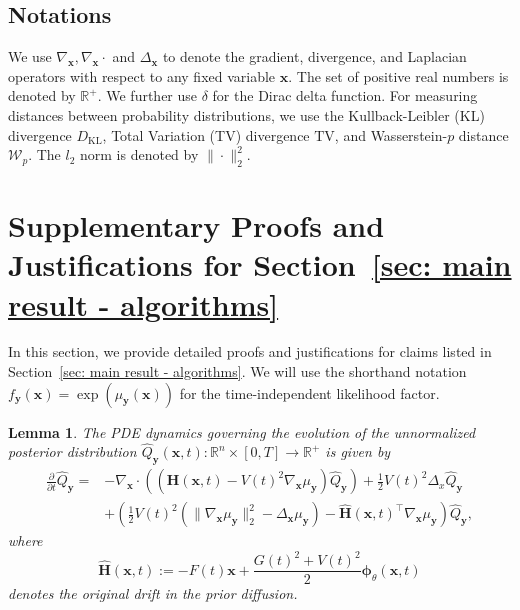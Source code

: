 \documentclass{article}
\numberwithin{equation}{section}
\newtheorem{lemma}[theorem]{Lemma}
\def\vx{{\bm{x}}}
\def\vy{{\bm{y}}}
\def\vphi{{\bm{\phi}}}
\def\mH{{\bm{H}}}
\def\gW{{\mathcal{W}}}
\newcommand{\KL}{D_{\mathrm{KL}}}
\newcommand{\TV}{\mathrm{TV}}
\begin{document}


\subsection{Notations}

We use $\nabla_{\vx}, \nabla_{\vx} \cdot$ and $\Delta_{\vx}$ to denote the gradient, divergence, and Laplacian operators with respect to any fixed variable $\vx$. The set of positive real numbers is denoted by $\mathbb{R}^{+}$. We further use $\delta$ for the Dirac delta function. For measuring distances between probability distributions, we use the Kullback-Leibler (KL) divergence $\KL$, Total Variation (TV) divergence $\TV$, and Wasserstein-$p$ distance $\gW_p$. The $l_2$ norm is denoted by $\|\cdot\|_2^2$.

\section{Supplementary Proofs and Justifications for Section~\ref{sec: main result - algorithms}}
\label{sec: derivations for Sec 3}
In this section, we provide detailed proofs and justifications for claims listed in Section~\ref{sec: main result - algorithms}. We will use the shorthand notation $f_{\vy}(\vx) = \exp(\mu_{\vy}(\vx))$ for the time-independent likelihood factor. 

\begin{lemma}
    \label{lem: simplifying dynamics}    
    The PDE dynamics governing the evolution of the unnormalized posterior distribution $\widehat{Q}_{\vy}(\vx,t):\mathbb{R}^n \times [0, T] \rightarrow \mathbb{R}^{+}$ is given by
    \begin{equation}
    \label{eqn: PDE of unnormalized posterior diffusion app}
        \begin{aligned}
        \frac{\partial}{\partial t}\widehat{Q}_{\vy} = &-\nabla_{\vx} \cdot \left(\left(\widehat{\mH}(\vx,t)-V(t)^2\nabla_{\vx}\mu_{\vy}\right)\widehat{Q}_{\vy}\right)
        +\frac{1}{2}V(t)^2\Delta_{x}\widehat{Q}_{\vy}\\
        &+\left(\frac{1}{2}V(t)^2\left(\|\nabla_{\vx}\mu_{\vy}\|_2^2-\Delta_{\vx}\mu_{\vy}\right) - \widehat{\mH}(\vx,t)^\intercal\nabla_{\vx}\mu_{\vy}\right)\widehat{Q}_{\vy},
        \end{aligned}    
    \end{equation}
    where 
    \begin{equation}
    \label{eqn: original drift with score}
    \widehat{\mH}(\vx,t) := -F(t)\vx + \frac{G(t)^2 + V(t)^2}{2} \vphi_\theta(\vx,t)    
    \end{equation}
    denotes the original drift in the prior diffusion.
\end{lemma}
\end{document}

